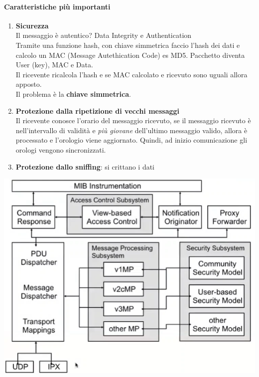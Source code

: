 \documentclass[10pt]{book}
\begin{document}
\paragraph{Caratteristiche più importanti} 
\begin{enumerate}
	\item \textbf{Sicurezza}\\
	Il messaggio è autentico? Data Integrity e Authentication\\
	Tramite una funzione hash, con chiave simmetrica faccio l'hash dei dati e calcolo un MAC (Message Autethication Code) es MD5. Pacchetto diventa User (key), MAC e Data.\\
	Il ricevente ricalcola l'hash e se MAC calcolato e ricevuto sono uguali allora apposto.\\
	Il problema è la \textbf{chiave simmetrica}.
	\item \textbf{Protezione dalla ripetizione di vecchi messaggi}\\
	Il ricevente conosce l'orario del messaggio ricevuto, se il messaggio ricevuto è nell'intervallo di validità e \textit{più giovane} dell'ultimo messaggio valido, allora è processato e l'orologio viene aggiornato. Quindi, ad inizio comunicazione gli orologi vengono sincronizzati.
	\item \textbf{Protezione dallo sniffing}: si crittano i dati
\end{enumerate}
\begin{center}
	\includegraphics[scale=0.75]{snmp3arch.png}
\end{center}
\end{document}
